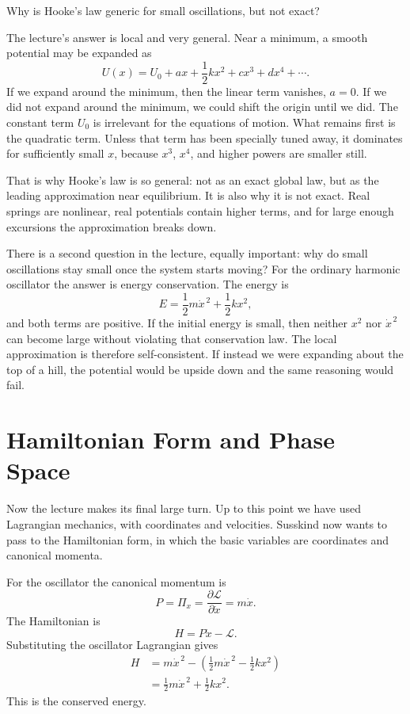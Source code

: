 Why is Hooke's law generic for small oscillations, but not exact?

The lecture's answer is local and very general. Near a minimum, a smooth potential may be expanded as
\begin{equation}
U(x)=U_0+ax+\frac12 kx^2+cx^3+dx^4+\cdots.
\end{equation}
If we expand around the minimum, then the linear term vanishes, \(a=0\). If we did not expand around the minimum, we could shift the origin until we did. The constant term \(U_0\) is irrelevant for the equations of motion. What remains first is the quadratic term. Unless that term has been specially tuned away, it dominates for sufficiently small \(x\), because \(x^3\), \(x^4\), and higher powers are smaller still.

That is why Hooke's law is so general: not as an exact global law, but as the leading approximation near equilibrium. It is also why it is not exact. Real springs are nonlinear, real potentials contain higher terms, and for large enough excursions the approximation breaks down.

There is a second question in the lecture, equally important: why do small oscillations stay small once the system starts moving? For the ordinary harmonic oscillator the answer is energy conservation. The energy is
\begin{equation}
E=\frac12 m\dot x^{\,2}+\frac12 kx^2,
\end{equation}
and both terms are positive. If the initial energy is small, then neither \(x^2\) nor \(\dot x^{\,2}\) can become large without violating that conservation law. The local approximation is therefore self-consistent. If instead we were expanding about the top of a hill, the potential would be upside down and the same reasoning would fail.

\section{Hamiltonian Form and Phase Space}

Now the lecture makes its final large turn. Up to this point we have used Lagrangian mechanics, with coordinates and velocities. Susskind now wants to pass to the Hamiltonian form, in which the basic variables are coordinates and canonical momenta.

For the oscillator the canonical momentum is
\begin{equation}
P=\Pi_x=\frac{\partial\mathcal{L}}{\partial\dot x}=m\dot x.
\end{equation}
The Hamiltonian is
\begin{equation}
H=P\dot x-\mathcal{L}.
\end{equation}
Substituting the oscillator Lagrangian gives
\begin{align}
H
&=
m\dot x^{\,2}
-
\left(
\frac12 m\dot x^{\,2}-\frac12 kx^2
\right)\\
&=
\frac12 m\dot x^{\,2}+\frac12 kx^2.
\end{align}
This is the conserved energy.

